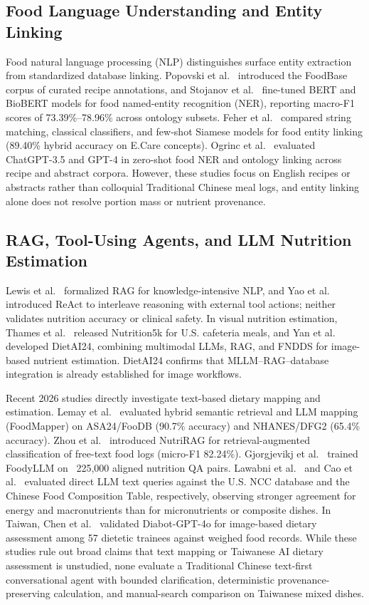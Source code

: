 \documentclass[conference]{IEEEtran}
\begin{document}
\subsection{Food Language Understanding and Entity Linking}
Food natural language processing (NLP) distinguishes surface entity extraction from standardized database linking. Popovski et al.~\cite{popovski2019foodbase} introduced the FoodBase corpus of curated recipe annotations, and Stojanov et al.~\cite{stojanov2021foodner} fine-tuned BERT and BioBERT models for food named-entity recognition (NER), reporting macro-F1 scores of 73.39\%--78.96\% across ontology subsets. Feher et al.~\cite{feher2023fewshot} compared string matching, classical classifiers, and few-shot Siamese models for food entity linking (89.40\% hybrid accuracy on E.Care concepts). Ogrinc et al.~\cite{ogrinc2024zeroshot} evaluated ChatGPT-3.5 and GPT-4 in zero-shot food NER and ontology linking across recipe and abstract corpora. However, these studies focus on English recipes or abstracts rather than colloquial Traditional Chinese meal logs, and entity linking alone does not resolve portion mass or nutrient provenance.

\subsection{RAG, Tool-Using Agents, and LLM Nutrition Estimation}
Lewis et al.~\cite{lewis2020rag} formalized RAG for knowledge-intensive NLP, and Yao et al.~\cite{yao2023react} introduced ReAct to interleave reasoning with external tool actions; neither validates nutrition accuracy or clinical safety. In visual nutrition estimation, Thames et al.~\cite{thames2021nutrition5k} released Nutrition5k for U.S. cafeteria meals, and Yan et al.~\cite{yan2025dietai24} developed DietAI24, combining multimodal LLMs, RAG, and FNDDS for image-based nutrient estimation. DietAI24 confirms that MLLM--RAG--database integration is already established for image workflows.

Recent 2026 studies directly investigate text-based dietary mapping and estimation. Lemay et al.~\cite{lemay2026foodmapper} evaluated hybrid semantic retrieval and LLM mapping (FoodMapper) on ASA24/FooDB (90.7\% accuracy) and NHANES/DFG2 (65.4\% accuracy). Zhou et al.~\cite{zhou2026nutrirag} introduced NutriRAG for retrieval-augmented classification of free-text food logs (micro-F1 82.24\%). Gjorgjevikj et al.~\cite{gjorgjevikj2026foodyllm} trained FoodyLLM on ~225,000 aligned nutrition QA pairs. Lawabni et al.~\cite{lawabni2026text} and Cao et al.~\cite{cao2026chinese} evaluated direct LLM text queries against the U.S. NCC database and the Chinese Food Composition Table, respectively, observing stronger agreement for energy and macronutrients than for micronutrients or composite dishes. In Taiwan, Chen et al.~\cite{chen2025diabot} validated Diabot-GPT-4o for image-based dietary assessment among 57 dietetic trainees against weighed food records. While these studies rule out broad claims that text mapping or Taiwanese AI dietary assessment is unstudied, none evaluate a Traditional Chinese text-first conversational agent with bounded clarification, deterministic provenance-preserving calculation, and manual-search comparison on Taiwanese mixed dishes.
\end{document}
